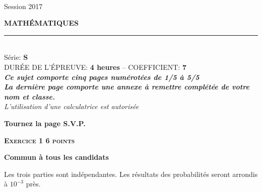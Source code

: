 \documentclass[a4paper,10pt]{article}
\begin{document}
\renewcommand{\labelitemi}{\textbullet} %
\SetWatermarkFontSize{1.8cm}
\pagestyle{fancy}
\chead{}%
\lfoot{} \cfoot{}\rfoot{}
\rule{0pt}{1.5cm}
\begin{center}
\\
\vspace{3cm}
Session 2017\\
\vspace{2cm}

{\LARGE {\bf MATH\'EMATIQUES}}\\
\rule{7cm}{1pt}\\
\vspace{1.5cm}
{\Large Série: {\bf S}}\\
\vspace{1.5cm}
DUR\'EE DE L'\'EPREUVE: {\bf 4 heures} -- COEFFICIENT: {\bf 7}\\
\vspace{2cm}
{\bf {\it Ce sujet comporte cinq pages numérotées de 1/5 à 5/5}}\\
{\bf {\it La dernière page comporte une annexe à remettre complétée de
    votre nom et classe.}}\\
\vspace{2cm}
{\it L'utilisation d'une calculatrice est autorisée}\\
\vspace{1.5cm}
\end{center}
\vfill
\hfill {\bf Tournez la page S.V.P.}
\newpage
%
%
%

%
%
\textbf{\textsc{Exercice 1 \hfill 6 points}}

\textbf{Commun à tous les candidats} 

\medskip

Les trois parties sont indépendantes. Les résultats des probabilités seront arrondis à $10^{-3} $ près.
\end{document}
